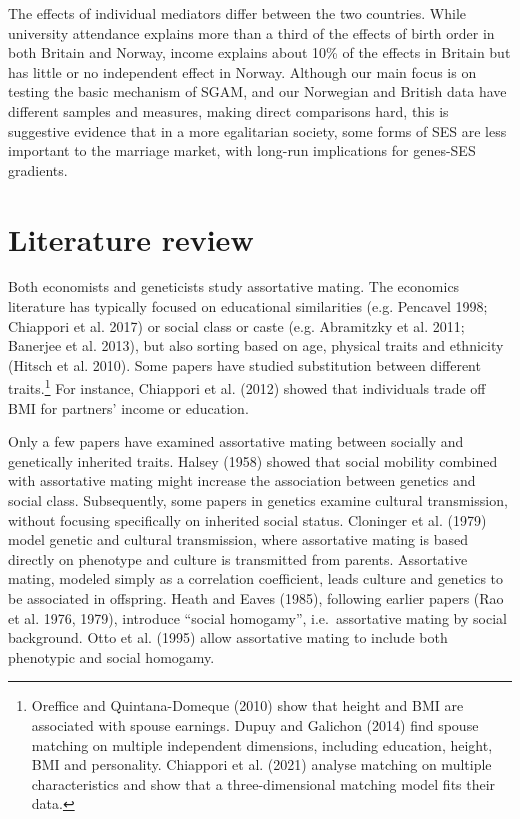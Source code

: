 \documentclass[
  12pt,
]{article}
\theoremstyle{definition}
\theoremstyle{definition}
\theoremstyle{definition}
\theoremstyle{definition}
\theoremstyle{remark}
\begin{document}
The effects of individual mediators differ between the two countries.
While university attendance explains more than a third of the effects of
birth order in both Britain and Norway, income explains about 10\% of the
effects in Britain but has little or no independent effect in Norway.
Although our main focus is on testing the basic mechanism of SGAM, and
our Norwegian and British data have different samples and measures,
making direct comparisons hard, this is suggestive evidence that in a
more egalitarian society, some forms of SES are less important to the
marriage market, with long-run implications for genes-SES gradients.

\section{Literature review}\label{literature-review}

Both economists and geneticists study assortative mating. The economics
literature has typically focused on educational similarities (e.g. Pencavel 1998; Chiappori et al. 2017) or social class or
caste (e.g. Abramitzky et al. 2011; Banerjee et al. 2013), but also
sorting based on age, physical traits and ethnicity
(Hitsch et al. 2010). Some papers have studied substitution between
different traits.\footnote{Oreffice and Quintana-Domeque (2010) show that height and BMI are associated
  with spouse earnings. Dupuy and Galichon (2014) find spouse matching on
  multiple independent dimensions, including education, height, BMI
  and personality. Chiappori et al. (2021) analyse matching on
  multiple characteristics and show that a three-dimensional matching
  model fits their data.} For instance, Chiappori et al. (2012) showed that
individuals trade off BMI for partners' income or education.

Only a few papers have examined assortative mating between socially and
genetically inherited traits. Halsey (1958) showed that social
mobility combined with assortative mating might increase the association
between genetics and social class. Subsequently, some papers in genetics
examine cultural transmission, without focusing specifically on
inherited social status. Cloninger et al. (1979) model genetic and
cultural transmission, where assortative mating is based directly on
phenotype and culture is transmitted from parents. Assortative mating,
modeled simply as a correlation coefficient, leads culture and genetics
to be associated in offspring. Heath and Eaves (1985), following earlier
papers (Rao et al. 1976, 1979), introduce ``social homogamy'',
i.e.~assortative mating by social background. Otto et al. (1995) allow
assortative mating to include both phenotypic and social homogamy.
\end{document}
